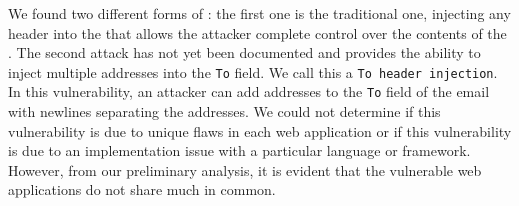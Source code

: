 
	

	
    
    We found two different forms of \ehi: the first one is the traditional one, injecting any header into the \email that allows the attacker complete control over the contents of the \email. 
The second attack has not yet been documented and provides the ability to inject multiple \email addresses into the \texttt{To} field. We call this a \texttt{To header injection}. In this  vulnerability, an attacker can add addresses to the \texttt{To} field of the email with newlines separating the \email addresses. We could not determine if this vulnerability is due to unique flaws in each web application or if this vulnerability is due to an implementation issue with a particular language or framework. However, from our preliminary analysis, it is evident that the vulnerable web applications do not share much in common. 

